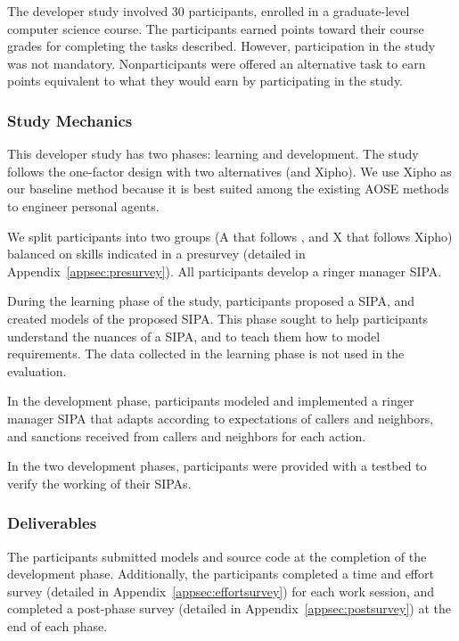 The developer study involved 30 participants, enrolled in a
graduate-level computer science course. The participants earned points
toward their course grades for completing the tasks described. However,
participation in the study was not mandatory. Nonparticipants were
offered an alternative task to earn points equivalent to what they would
earn by participating in the study.

\subsubsection*{Study Mechanics}

This developer study has two phases: learning and development.  The study 
follows the one-factor design with two alternatives (\frameworkA and Xipho).  
We use Xipho as our baseline method because it is best suited among the
existing AOSE methods to engineer personal agents.

We split participants into two groups (A that follows \frameworkA, and X
that follows Xipho) balanced on skills indicated in a presurvey
(detailed in Appendix~\ref{appsec:presurvey}). All participants develop
a ringer manager SIPA.

\begin{description}[leftmargin=1em]

\item[Learning Phase.] During the learning phase of the study,
participants proposed a SIPA, and created models of the proposed SIPA.
This phase sought to help participants understand the nuances of a SIPA,
and to teach them how to model requirements. The data collected in the
learning phase is not used in the evaluation. 

\item[Development Phase.] In the development phase, participants
modeled and implemented a ringer manager SIPA that adapts according
to expectations of callers and 
neighbors, and sanctions received from callers and
neighbors for each action.

\end{description}

In the two development phases, participants were provided with a testbed
to verify the working of their SIPAs.

\subsubsection*{Deliverables}

The participants submitted models and source code at the completion of
the development phase. Additionally, the participants completed a time
and effort survey (detailed in Appendix~\ref{appsec:effortsurvey}) for
each work session, and completed a post-phase survey (detailed in
Appendix~\ref{appsec:postsurvey}) at the end of each phase.

